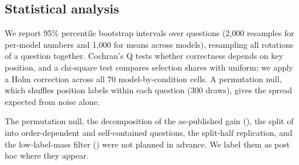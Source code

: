 \subsection{Statistical analysis}

We report 95\% percentile bootstrap intervals over questions (2{,}000 resamples for per-model numbers and 1{,}000 for means across models), resampling all rotations of a question together.
Cochran's Q tests whether correctness depends on key position, and a chi-square test compares selection shares with uniform; we apply a Holm correction across all 70 model-by-condition cells.
A permutation null, which shuffles position labels within each question (300 draws), gives the spread expected from noise alone.

The permutation null, the decomposition of the as-published gain (), the split of \mmlu into order-dependent and self-contained questions, the split-half replication, and the low-label-mass filter () were not planned in advance.
We label them as post hoc where they appear.
